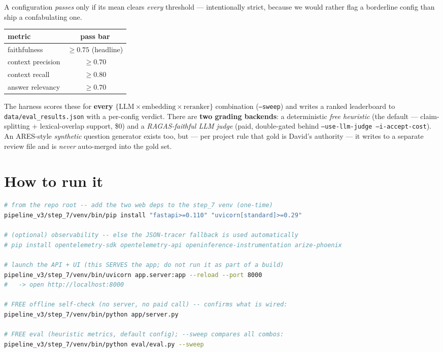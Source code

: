 \documentclass[11pt]{article}
\newcommand{\code}[1]{\texttt{#1}}
\begin{document}
\noindent A configuration \emph{passes} only if its mean clears \emph{every}
threshold --- intentionally strict, because we would rather flag a borderline
config than ship a confabulating one.

\begin{numbersbox}
\centering\small
\begin{tabular}{lc}
\toprule
metric & pass bar \\
\midrule
faithfulness       & $\ge 0.75$ \quad(headline) \\
context precision  & $\ge 0.70$ \\
context recall     & $\ge 0.80$ \\
answer relevancy   & $\ge 0.70$ \\
\bottomrule
\end{tabular}
\end{numbersbox}

The harness scores these for \textbf{every} $\{\text{LLM} \times
\text{embedding} \times \text{reranker}\}$ combination (\code{--sweep}) and
writes a ranked leaderboard to \code{data/eval\_results.json} with a per-config
verdict. There are \textbf{two grading backends}: a deterministic \emph{free
heuristic} (the default --- claim-splitting + lexical-overlap support, \$0) and a
\emph{RAGAS-faithful LLM judge} (paid, double-gated behind
\code{--use-llm-judge --i-accept-cost}). An ARES-style \emph{synthetic} question
generator exists too, but --- per project rule that gold is David's authority ---
it writes to a separate review file and is \emph{never} auto-merged into the gold
set.

\section{How to run it}

\begin{lstlisting}[language=bash]
# from the repo root -- add the two web deps to the step_7 venv (one-time)
pipeline_v3/step_7/venv/bin/pip install "fastapi>=0.110" "uvicorn[standard]>=0.29"

# (optional) observability -- else the JSON-tracer fallback is used automatically
# pip install opentelemetry-sdk opentelemetry-api openinference-instrumentation arize-phoenix

# launch the API + UI (this SERVES the app; do not run it as part of a build)
pipeline_v3/step_7/venv/bin/uvicorn app.server:app --reload --port 8000
#   -> open http://localhost:8000

# FREE offline self-check (no server, no paid call) -- confirms what is wired:
pipeline_v3/step_7/venv/bin/python app/server.py

# FREE eval (heuristic metrics, default config); --sweep compares all combos:
pipeline_v3/step_7/venv/bin/python eval/eval.py --sweep
\end{lstlisting}
\end{document}
